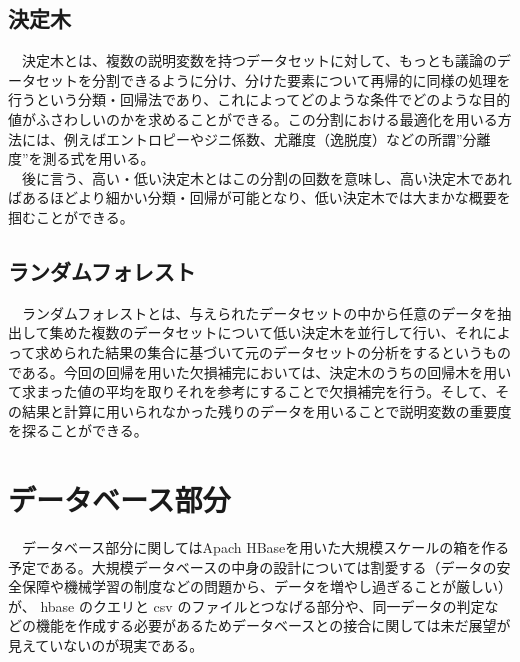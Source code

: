 \documentclass{scrartcl}
\begin{document}
\subsection{決定木}
\label{sec:org2457ac4}
　決定木とは、複数の説明変数を持つデータセットに対して、もっとも議論のデータセットを分割できるように分け、分けた要素について再帰的に同様の処理を行うという分類・回帰法であり、これによってどのような条件でどのような目的値がふさわしいのかを求めることができる。この分割における最適化を用いる方法には、例えばエントロピーやジニ係数、尤離度（逸脱度）などの所謂”分離度”を測る式を用いる。\\
　後に言う、高い・低い決定木とはこの分割の回数を意味し、高い決定木であればあるほどより細かい分類・回帰が可能となり、低い決定木では大まかな概要を掴むことができる。\\

\subsection{ランダムフォレスト　}
\label{sec:org555b5ad}
　ランダムフォレストとは、与えられたデータセットの中から任意のデータを抽出して集めた複数のデータセットについて低い決定木を並行して行い、それによって求められた結果の集合に基づいて元のデータセットの分析をするというものである。今回の回帰を用いた欠損補完においては、決定木のうちの回帰木を用いて求まった値の平均を取りそれを参考にすることで欠損補完を行う。そして、その結果と計算に用いられなかった残りのデータを用いることで説明変数の重要度を探ることができる。\\

\section{データベース部分}
\label{sec:orgbf37af6}
　データベース部分に関してはApach HBaseを用いた大規模スケールの箱を作る予定である。大規模データベースの中身の設計については割愛する（データの安全保障や機械学習の制度などの問題から、データを増やし過ぎることが厳しい）が、 hbase のクエリと csv のファイルとつなげる部分や、同一データの判定などの機能を作成する必要があるためデータベースとの接合に関しては未だ展望が見えていないのが現実である。\\
\end{document}

